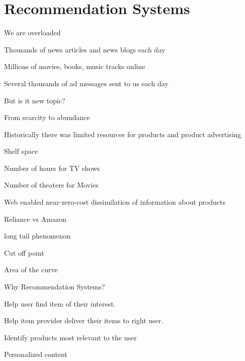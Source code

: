 	\chapter{Recommendation Systems}

	\begin{bulletedlist}
		\item We are overloaded
		\begin{bulletedlist}
			\item Thousands of news articles and news blogs each day
			\item Millions of movies, books, music tracks online
			\item Several thousands of ad messages sent to us each day
			\item But is it new topic?
		\end{bulletedlist}
		\item From scarcity to abundance
		\begin{bulletedlist}
			\item Historically there was limited resources for products and product advertising
			\begin{bulletedlist}
				\item Shelf space
				\item Number of hours for TV shows
				\item Number of theaters for Movies
			\end{bulletedlist}
			\item Web enabled near-zero-cost dissimilation of information about products
			\begin{bulletedlist}
				\item Reliance vs Amazon
				\item long tail phenomenon
				\item Cut off point
				\item Area of the curve
			\end{bulletedlist}
		\end{bulletedlist}
		\item Why Recommendation Systems?
		\begin{bulletedlist}
			\item Help user find item of their interest.
			\item Help item provider deliver their items to right user.
			\begin{bulletedlist}
				\item Identify products most relevant to the user
				\item Personalized content

\end{bulletedlist}
\end{bulletedlist}
\end{bulletedlist}
